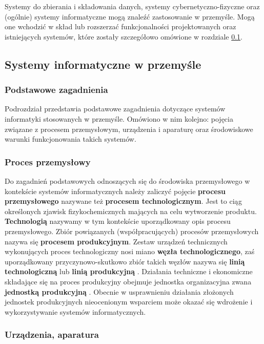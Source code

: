\documentclass[a4paper, 12pt, twoside]{article}
\begin{document}
Systemy do zbierania i składowania danych, systemy 
cybernetyczno-fizyczne oraz (ogólnie) systemy informatyczne mogą znaleźć 
zastosowanie w przemyśle. Mogą one wchodzić w skład lub rozszerzać funkcjonalności
projektowanych oraz istniejących systemów, które zostały szczegółowo omówione
w rozdziale \ref{isp}.

\subsection{Systemy informatyczne w przemyśle} \label{isp}

\subsubsection{Podstawowe zagadnienia}

Podrozdział przedstawia podstawowe zagadnienia dotyczące systemów informatyki
stosowanych w przemyśle. Omówiono w nim kolejno: pojęcia związane z procesem przemysłowym,
urządzenia i aparaturę oraz środowiskowe warunki funkcjonowania takich systemów.

\subsubsection*{Proces przemysłowy} 

Do zagadnień podstawowych odnoszących się do środowiska przemysłowego w kontekście 
systemów informatycznych należy zaliczyć pojęcie \textbf{procesu przemysłowego} 
nazywane też \textbf{procesem technologicznym}.
Jest to ciąg określonych zjawisk fizykochemicznych mających na celu wytworzenie
produktu. \textbf{Technologią} nazywamy w tym kontekście uporządkowany opis procesu przemysłowego.
Zbiór powiązanych (współpracujących) procesów przemysłowych nazywa się 
\textbf{procesem produkcyjnym}. Zestaw urządzeń technicznych wykonujących
proces technologiczny nosi miano \textbf{węzła technologicznego}, zaś
uporządkowany przyczynowo-skutkowo zbiór takich węzłów nazywa się \textbf{linią technologiczną}
lub \textbf{linią produkcyjną} \cite{isp}. Działania techniczne i ekonomiczne
składające się na proces produkcyjny obejmuje jednostka organizacyjna zwana
\textbf{jednostką produkcyjną} \cite{jednostka-produkcyjna}. Obecnie w usprawnieniu
działania złożonych jednostek produkcyjnych nieocenionym wsparciem może okazać się
wdrożenie i wykorzystywanie systemów informatycznych.

\subsubsection*{Urządzenia, aparatura} 
\end{document}
